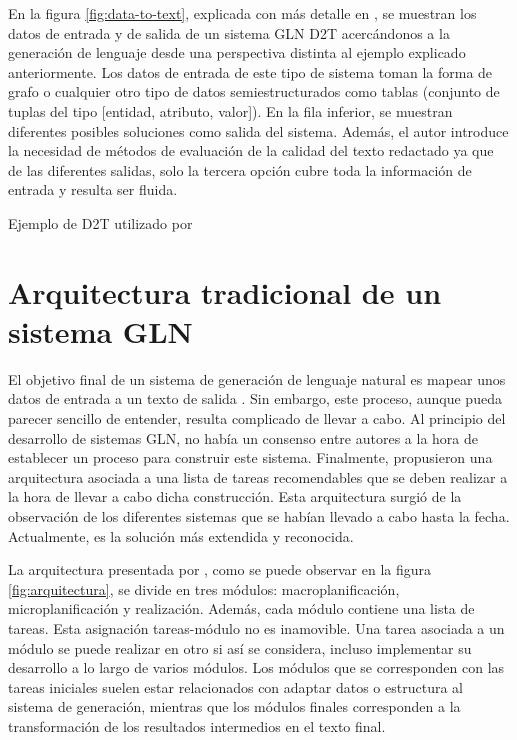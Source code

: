 En la figura \ref{fig:data-to-text}, explicada con más detalle en \cite{sai2020survey}, se muestran los datos de entrada y de salida de un sistema GLN D2T acercándonos a la generación de lenguaje desde una perspectiva distinta al ejemplo explicado anteriormente.  Los datos de entrada de este tipo de sistema toman la forma de grafo o cualquier otro tipo de datos semiestructurados como tablas (conjunto de tuplas del tipo [entidad, atributo, valor]). En la fila inferior, se muestran diferentes posibles soluciones como salida del sistema. Además, el autor introduce la necesidad de métodos de evaluación de la calidad del texto redactado ya que de las diferentes salidas, solo la tercera opción cubre toda la información de entrada y resulta ser fluida.

%
{Ejemplo de D2T utilizado por \cite{sai2020survey}}

\section{Arquitectura tradicional de un sistema GLN}
\label{sec:arquitectura_tradicional}
El objetivo final de un sistema de generación de lenguaje natural es mapear unos datos de entrada a un texto de salida \citep{reiter1997building}. Sin embargo, este proceso, aunque pueda parecer sencillo de entender, resulta complicado de llevar a cabo. Al principio del desarrollo de sistemas GLN, no había un consenso entre autores a la hora de establecer un proceso para construir este sistema. Finalmente, \cite{reiter1997building} propusieron una arquitectura asociada a una lista de tareas recomendables que se deben realizar a la hora de llevar a cabo dicha construcción. Esta arquitectura surgió de la observación de los diferentes sistemas que se habían llevado a cabo hasta la fecha.  Actualmente, es la solución más extendida y reconocida.

La arquitectura presentada por \cite{reiter1997building}, como se puede observar en la figura \ref{fig:arquitectura}, se divide en tres módulos: macroplanificación, microplanificación y realización. Además, cada módulo contiene una lista de tareas. Esta asignación tareas-módulo no es inamovible. Una tarea asociada a un módulo se puede realizar en otro si así se considera, incluso implementar su desarrollo a lo largo de varios módulos. Los módulos que se corresponden con las tareas iniciales suelen estar relacionados con adaptar datos o estructura al sistema de generación, mientras que los módulos finales corresponden a la transformación de los resultados intermedios en el texto final.

